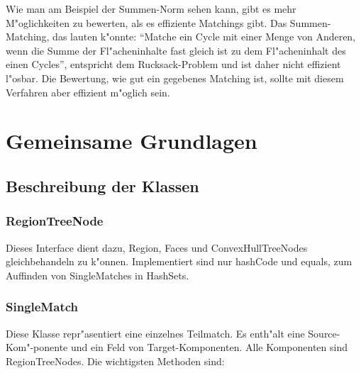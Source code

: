 Wie man am Beispiel der Summen-Norm sehen kann, gibt es mehr M"oglichkeiten zu bewerten, als es effiziente Matchings gibt. Das Summen-Matching, das lauten k"onnte: "`Matche ein Cycle mit  einer Menge von Anderen, wenn die Summe der Fl"acheninhalte fast gleich ist zu dem Fl"acheninhalt des einen Cycles"', entspricht dem Rucksack-Problem und ist daher nicht effizient l"osbar. Die Bewertung, wie gut ein gegebenes Matching ist, sollte mit diesem Verfahren aber effizient m"oglich sein.

\section{Gemeinsame Grundlagen }
\subsection{Beschreibung der Klassen}
\subsubsection{RegionTreeNode}

Dieses Interface dient dazu, Region, Faces und ConvexHullTreeNodes gleichbehandeln zu k"onnen. Implementiert sind nur hashCode und equals, zum Auffinden von SingleMatches in HashSets.

\subsubsection{SingleMatch}
Diese Klasse repr"asentiert eine einzelnes Teilmatch.  Es enth"alt eine Source-Kom"-ponente und ein Feld von Target-Komponenten. Alle Komponenten sind RegionTreeNodes.
Die wichtigsten Methoden sind:


